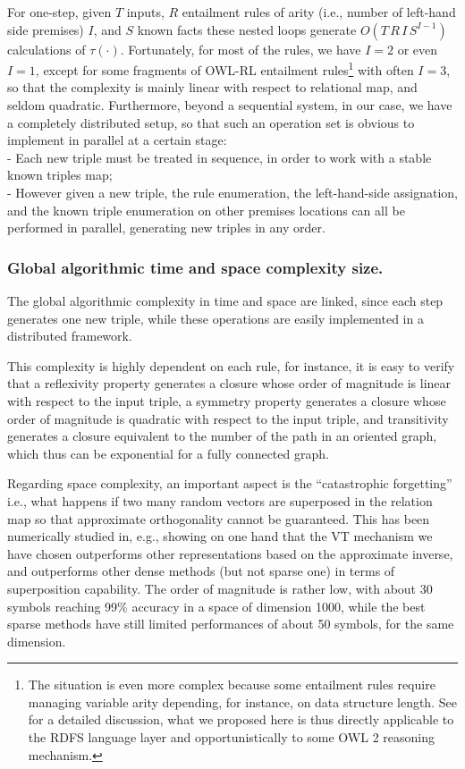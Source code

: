 \documentclass[sn-mathphys]{sn-jnl}
\begin{document}
For one-step, given $T$ inputs, $R$ entailment rules of arity (i.e., number of left-hand side premises) $I$, and $S$ known facts these nested loops generate $O(T\,R\,I\,S^{I-1})$ calculations of $\tau(\cdot)$. Fortunately, for most of the rules, we have $I=2$ or even $I=1$, except for some fragments of OWL-RL entailment rules\footnote{The situation is even more complex because some entailment rules require managing variable arity depending, for instance, on data structure length. See \cite{cao_web_2014} for a detailed discussion, what we proposed here is thus directly applicable to the RDFS language layer and opportunistically to some OWL 2 reasoning mechanism.} with often $I=3$, so that the complexity is mainly linear with respect to relational map, and seldom quadratic. Furthermore, beyond a sequential system, in our case, we have a completely distributed setup, so that such an operation set is obvious to implement in parallel at a certain stage:
\\- Each new triple must be treated in sequence, in order to work with a stable known triples map;
\\- However given a new triple, the rule enumeration, the left-hand-side assignation, and the known triple enumeration on other premises locations can all be performed in parallel, generating new triples in any order.

\subsubsection{Global algorithmic time and space complexity size.}

The global algorithmic complexity in time and space are linked, since each step generates one new triple, while these operations are easily implemented in a distributed framework.

This complexity is highly dependent on each rule, for instance, it is easy to verify that a reflexivity property generates a closure whose order of magnitude is linear with respect to the input triple, a symmetry property generates a closure whose order of magnitude is quadratic with respect to the input triple, and transitivity generates a closure equivalent to the number of the path in an oriented graph, which thus can be exponential for a fully connected graph.

Regarding space complexity, an important aspect is the ``catastrophic forgetting'' i.e., what happens if two many random vectors are superposed in the relation map so that approximate orthogonality cannot be guaranteed. This has been numerically studied in, e.g., \cite{schlegel_comparison_2020} showing on one hand that the VT mechanism we have chosen outperforms other representations based on the approximate inverse, and outperforms other dense methods (but not sparse one) in terms of superposition capability. The order of magnitude is rather low, with about 30 symbols reaching 99\% accuracy in a space of dimension 1000, while the best sparse methods have still limited performances of about 50 symbols, for the same dimension.
\end{document}

